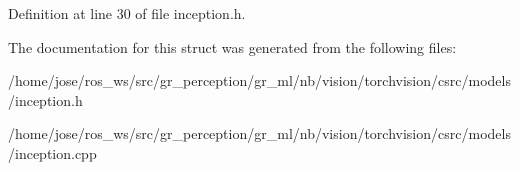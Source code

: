 Definition at line 30 of file inception.\+h.



The documentation for this struct was generated from the following files\+:\begin{DoxyCompactItemize}
\item 
/home/jose/ros\+\_\+ws/src/gr\+\_\+perception/gr\+\_\+ml/nb/vision/torchvision/csrc/models/inception.\+h\item 
/home/jose/ros\+\_\+ws/src/gr\+\_\+perception/gr\+\_\+ml/nb/vision/torchvision/csrc/models/inception.\+cpp\end{DoxyCompactItemize}
